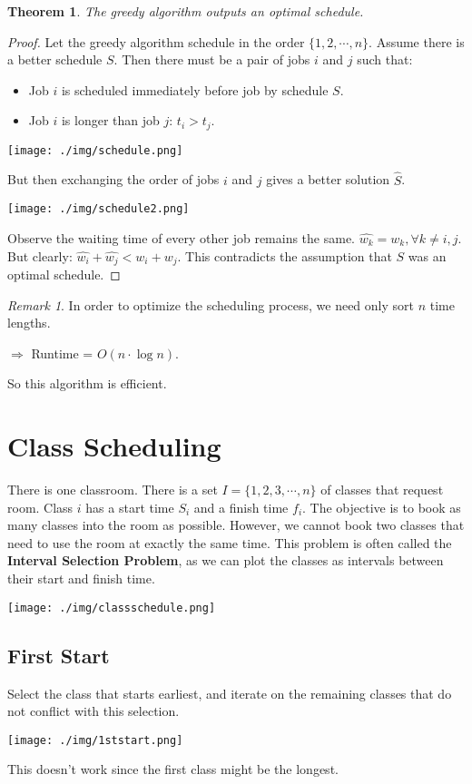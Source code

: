 \documentclass[11pt, a4paper, oneside]{book}
\theoremstyle{theoremdd}
\newtheorem{theorem}{Theorem}[chapter]
\theoremstyle{remark}
\newtheorem*{remark}{Remark}
\begin{document}
\begin{theorem}
The greedy algorithm outputs an optimal schedule.
\end{theorem}
\begin{proof}
Let the greedy algorithm schedule in the order $\{1,2,\cdots,n\}$. Assume there is a better schedule $S$. Then there must be a pair of jobs $i$ and $j$ such that: 
\begin{itemize}
\item Job $i$ is scheduled immediately before job by schedule $S$.
\item Job $i$ is longer than job $j$: $t_{i}>t_{j}$.
\end{itemize}
\begin{center}
\texttt{[image: ./img/schedule.png]}
\end{center}
But then exchanging the order of jobs $i$ and $j$ gives a better solution $\hat{S}$.
\begin{center}
\texttt{[image: ./img/schedule2.png]}
\end{center}
Observe the waiting time of every other job remains the same. $\hat{w_{k}}=w_{k}, \forall k \neq i,j$. But clearly: $\hat{w_{i}}+\hat{w_{j}} < w_{i}+w_{j}$. This contradicts the assumption that $S$ was an optimal schedule. 
\end{proof}
\begin{remark}
In order to optimize the scheduling process, we need only sort $n$ time lengths.
\begin{center}
$\Rightarrow$ Runtime = $O(n\cdot \log n)$. 
\end{center}
So this algorithm is efficient.
\end{remark}
\section{Class Scheduling}
There is one classroom. There is a set $I=\{1,2,3,\cdots,n\}$ of classes that request room. Class $i$ has a start time $S_{i}$ and a finish time $f_{i}$. The objective is to book as many classes into the room as possible. However, we cannot book two classes that need to use the room at exactly the same time. This problem is often called the \textbf{Interval Selection Problem}, as we can plot the classes as intervals between their start and finish time. 
\begin{center}
\texttt{[image: ./img/classschedule.png]}
\end{center}
\subsection{First Start}
Select the class that starts earliest, and iterate on the remaining classes that do not conflict with this selection. 
\begin{center}
\texttt{[image: ./img/1ststart.png]}
\end{center}
This doesn't work since the first class might be the longest.
\end{document}
